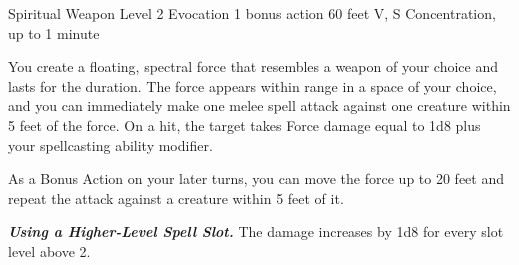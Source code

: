 \DndSpellHeader%
    {Spiritual Weapon}
    {Level 2 Evocation}
    {1 bonus action}
    {60 feet}
    {V, S}
    {Concentration, up to 1 minute}

You create a floating, spectral force that resembles a weapon of your choice and lasts for the duration. The force appears within range in a space of your choice, and you can immediately make one melee spell attack against one creature within 5 feet of the force. On a hit, the target takes Force damage equal to 1d8 plus your spellcasting ability modifier.

As a Bonus Action on your later turns, you can move the force up to 20 feet and repeat the attack against a creature within 5 feet of it.

\textbf{\textit{Using a Higher-Level Spell Slot.}} The damage increases by 1d8 for every slot level above 2.
